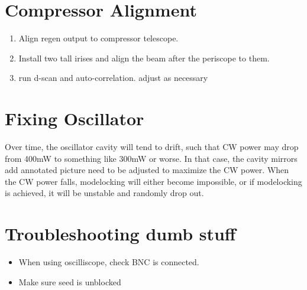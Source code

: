 \documentclass{article}
\begin{document}
\section{Compressor Alignment}
\begin{enumerate}
    \item Align regen output to compressor telescope.
    \item Install two tall irises and align the beam after the periscope to them.
    \item run d-scan and auto-correlation. adjust as necessary
\end{enumerate}

\section{Fixing Oscillator}
Over time, the oscillator cavity will tend to drift, such that CW power may drop from 400mW to something like 300mW or worse.
In that case, the cavity mirrors {\color{red} add annotated picture} need to be adjusted to maximize the CW power.
When the CW power falls, modelocking will either become impossible, or if modelocking is achieved, it will be unstable and randomly drop out.

\section{Troubleshooting dumb stuff}
\begin{itemize}
    \item When using oscilliscope, check BNC is connected.
    \item Make sure seed is unblocked
\end{itemize}
\end{document}
